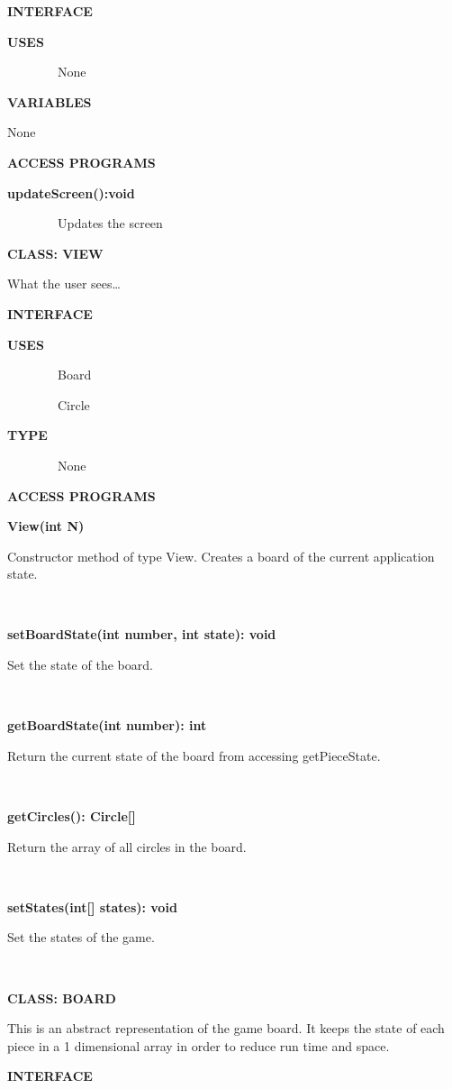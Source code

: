 \documentclass{article}
\begin{document}
{{\textbf{INTERFACE}}

{\textbf{USES}}

{~~~~~~~~None}

{\textbf{VARIABLES}}

{None}

{\textbf{ACCESS PROGRAMS}}

{\textbf{updateScreen():void}}

{~~~~~~~~Updates the screen}

{}

{\textbf{CLASS: VIEW}}

{What the user sees\ldots{}}

{\textbf{INTERFACE}}

{\textbf{USES}}

{~~~~~~~~Board}

{~~~~~~~~Circle}

{\textbf{TYPE}}

{~~~~~~~~None}

{\textbf{ACCESS PROGRAMS}}

{\textbf{View(int N)}}

{Constructor method of type View. Creates a board of the current
application state.}

{~~~~~~~~~~~~~~~~}

{\textbf{setBoardState(int number, int state): void}}

{Set the state of the board.}

{~~~~~~~~~~~~~~~~}

{\textbf{getBoardState(int number): int}}

{Return the current state of the board from accessing
getPieceState.}

{~~~~~~~~~~~~~~~~}

{\textbf{getCircles(): Circle{[}{]}}}

{Return the array of all circles in the board.}

{~~~~~~~~~~~~~~~~}

{\textbf{setStates(int{[}{]} states): void}}

{Set the states of the game.}

{~~~~~~~~~~~~~~~~}

{}

{\textbf{CLASS: BOARD}}

{This is an abstract representation of the game board. It keeps the
state of each piece in a 1 dimensional array in order to reduce run time
and space.}

{\textbf{INTERFACE}}

}
\end{document}
